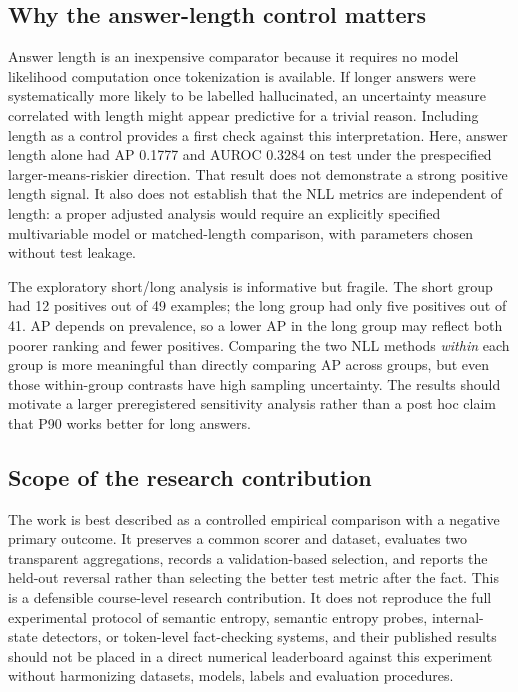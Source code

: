\documentclass[manuscript,screen]{acmart}
\begin{document}
\subsection{Why the answer-length control matters}
Answer length is an inexpensive comparator because it requires no model likelihood computation once tokenization is available. If longer answers were systematically more likely to be labelled hallucinated, an uncertainty measure correlated with length might appear predictive for a trivial reason. Including length as a control provides a first check against this interpretation. Here, answer length alone had AP 0.1777 and AUROC 0.3284 on test under the prespecified larger-means-riskier direction. That result does not demonstrate a strong positive length signal. It also does not establish that the NLL metrics are independent of length: a proper adjusted analysis would require an explicitly specified multivariable model or matched-length comparison, with parameters chosen without test leakage.

The exploratory short/long analysis is informative but fragile. The short group had 12 positives out of 49 examples; the long group had only five positives out of 41. AP depends on prevalence, so a lower AP in the long group may reflect both poorer ranking and fewer positives. Comparing the two NLL methods \emph{within} each group is more meaningful than directly comparing AP across groups, but even those within-group contrasts have high sampling uncertainty. The results should motivate a larger preregistered sensitivity analysis rather than a post hoc claim that P90 works better for long answers.

\subsection{Scope of the research contribution}
The work is best described as a controlled empirical comparison with a negative primary outcome. It preserves a common scorer and dataset, evaluates two transparent aggregations, records a validation-based selection, and reports the held-out reversal rather than selecting the better test metric after the fact. This is a defensible course-level research contribution. It does not reproduce the full experimental protocol of semantic entropy, semantic entropy probes, internal-state detectors, or token-level fact-checking systems, and their published results should not be placed in a direct numerical leaderboard against this experiment without harmonizing datasets, models, labels and evaluation procedures.
\end{document}
